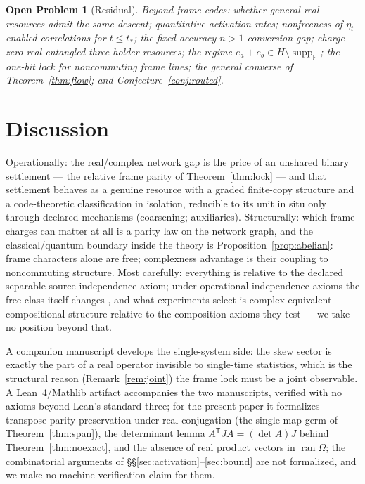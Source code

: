 \documentclass[11pt]{article}
\theoremstyle{plain}
\theoremstyle{definition}
\theoremstyle{remark}
\theoremstyle{plain}
\newtheorem{problem}[theorem]{Open Problem}
\newcommand{\F}{\mathbb{F}}
\newcommand{\Om}{\Omega}
\newcommand{\suppop}{\operatorname{ran}}
\newcommand{\suppF}{\operatorname{supp}_{\F}}
\begin{document}
\begin{problem}[Residual]
Beyond frame codes: whether general real resources admit the same
descent; quantitative activation rates; nonfreeness of
$\eta_t$-enabled correlations for $t\le t_*$; the fixed-accuracy
$n>1$ conversion gap; charge-zero real-entangled three-holder
resources; the regime $e_a+e_b\in H\setminus\suppF$; the one-bit
lock for noncommuting frame lines; the general converse of
Theorem~\ref{thm:flow}; and Conjecture~\ref{conj:routed}.
\end{problem}

\section{Discussion}\label{sec:disc}

Operationally: the real/complex network gap is the price of an
unshared binary settlement --- the relative frame parity of
Theorem~\ref{thm:lock} --- and that settlement behaves as a
genuine resource with a graded finite-copy structure and a
code-theoretic classification in isolation, reducible to its unit
in situ only through declared mechanisms (coarsening;
auxiliaries). Structurally: which frame charges can matter at all
is a parity law on the network graph, and the classical/quantum
boundary inside the theory is Proposition~\ref{prop:abelian}:
frame characters alone are free; complexness advantage is their
coupling to noncommuting structure. Most carefully: everything is
relative to the declared separable-source-independence axiom;
under operational-independence axioms the free class itself
changes \cite{hoffreumon2026}, and what experiments select is
complex-equivalent compositional structure relative to the
composition axioms they test --- we take no position beyond that.

A companion manuscript \cite{companion} develops the
single-system side: the skew sector is exactly the part of a real
operator invisible to single-time statistics, which is the
structural reason (Remark~\ref{rem:joint}) the frame lock must be
a joint observable. A Lean~4/Mathlib artifact accompanies the two
manuscripts, verified with no axioms beyond Lean's standard
three; for the present paper it formalizes transpose-parity
preservation under real conjugation (the single-map germ of
Theorem~\ref{thm:span}), the determinant lemma
$A^{\mathsf T}JA = (\det A)J$ behind Theorem~\ref{thm:noexact},
and the absence of real product vectors in $\suppop\Om$; the
combinatorial arguments of \S\S\ref{sec:activation}--\ref{sec:bound}
are not formalized, and we make no machine-verification claim for
them.
\end{document}
